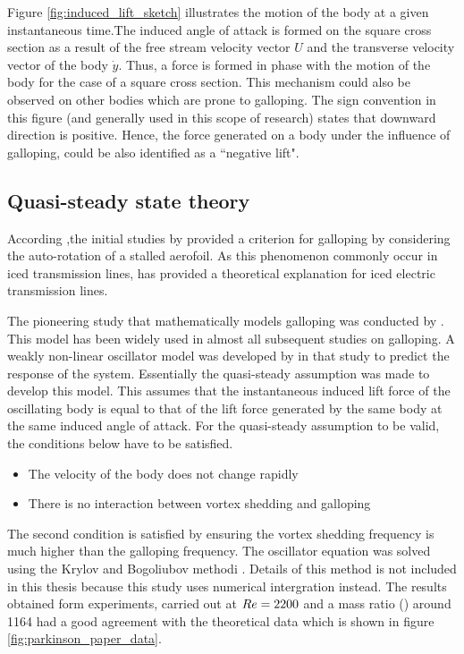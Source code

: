 

 Figure \ref{fig:induced_lift_sketch}  illustrates the motion of the body at a given instantaneous time.The induced angle of attack is formed on the square cross section as a result of the free stream velocity vector $U$ and the transverse velocity vector of the body $\dot{y}$. Thus, a force is formed in phase with the motion of the body for the case of a square cross section. This mechanism could also be observed on other bodies which are prone to galloping. The sign convention in this figure (and generally used in this scope of research) states that downward direction is positive. Hence, the force generated on a body under the influence of galloping, could be also identified as a ``negative lift".
 

\subsection{Quasi-steady state theory}
\label{sec:QSS theory}


According \cite{Paidoussis2010},the initial studies by \cite{Glauert1919} provided a criterion for galloping by considering the auto-rotation of a stalled aerofoil. As this phenomenon commonly occur in iced transmission lines, \cite{DenHartog1956} has provided a theoretical explanation for iced electric transmission lines. 

The pioneering study that mathematically models galloping was conducted by \cite{Parkinson1964}. This model has been widely used in almost all subsequent studies on galloping. A weakly non-linear oscillator model was developed by in that study to predict the response of the system. Essentially the quasi-steady assumption was made to develop this model. This assumes that the instantaneous induced lift force of the oscillating body is equal to that of the lift force generated by the same body at the same induced angle of attack. For the quasi-steady assumption to be valid, the conditions below have to be satisfied.

\begin{itemize}
 \item The velocity of the body does not change rapidly
 \item There is no interaction between vortex shedding and galloping
\end{itemize}

The second condition is satisfied by ensuring the vortex shedding frequency is much higher than the galloping frequency.
The oscillator equation was solved using the Krylov and Bogoliubov methodi . Details of this method is not included in this thesis because this study uses numerical intergration instead. The results obtained form experiments, carried out at $Re=2200$ and a mass ratio (\mstar) around 1164 had a good agreement with the theoretical data which is shown in figure \ref{fig:parkinson_paper_data}.


